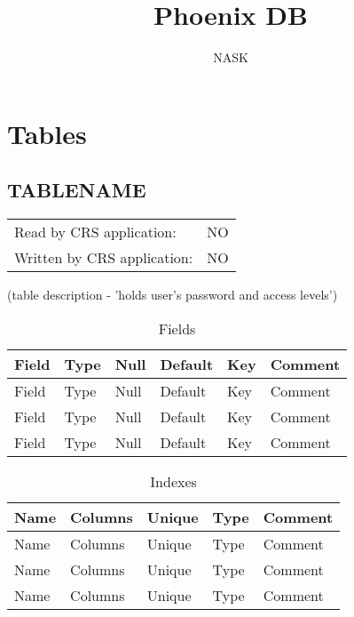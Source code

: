 \documentclass[11pt,a4paper]{article}
\title{Phoenix DB}
\author{NASK}
\date{}
\begin{document}
\maketitle
 
 
\section{Tables} 
 
\subsection{TABLENAME}

\begin{table}[h]
\begin{tabular}{l  l }
Read by CRS application: & NO\\
Written by CRS application: & NO\\
\end{tabular}
\end{table}

(table description - 'holds user's password and access levels')
\begin{table}[h]
\label{Fields}
\begin{tabular}{l  l  l  l  l  l }
Field & Type & Null & Default & Key & Comment \\
\hline
Field & Type & Null & Default & Key & Comment \\
Field & Type & Null & Default & Key & Comment \\
Field & Type & Null & Default & Key & Comment \\


\end{tabular}
\caption{Fields}
\end{table}


\begin{table}[h]
\begin{tabular}{l  l  l  l  l }
Name & Columns & Unique & Type & Comment \\
\hline
Name & Columns & Unique & Type & Comment \\
Name & Columns & Unique & Type & Comment \\
Name & Columns & Unique & Type & Comment \\


\end{tabular}
\caption{Indexes}
\end{table}
\end{document}

